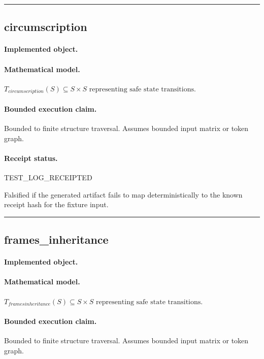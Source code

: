 \vspace{1em}\hrule\vspace{1em}
\subsection{circumscription}
\paragraph{Implemented object.} 
\paragraph{Mathematical model.} $T_{circumscription}(S) \subseteq S \times S \text{ representing safe state transitions}.$
\paragraph{Bounded execution claim.} Bounded to finite structure traversal. Assumes bounded input matrix or token graph.
\paragraph{Receipt status.} TEST\_LOG\_RECEIPTED
\begin{falsifier}
Falsified if the generated artifact fails to map deterministically to the known receipt hash for the fixture input.
\end{falsifier}

\vspace{1em}\hrule\vspace{1em}
\subsection{frames\_inheritance}
\paragraph{Implemented object.} 
\paragraph{Mathematical model.} $T_{framesinheritance}(S) \subseteq S \times S \text{ representing safe state transitions}.$
\paragraph{Bounded execution claim.} Bounded to finite structure traversal. Assumes bounded input matrix or token graph.
